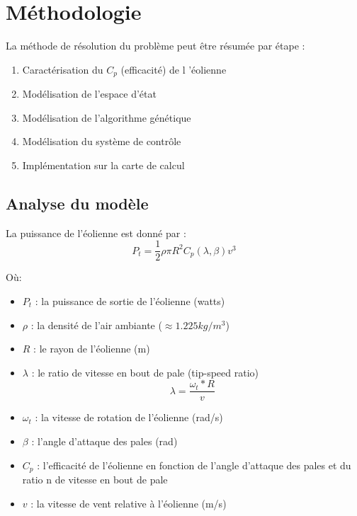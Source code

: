\section{Méthodologie} %
\label{sec:Méthodologie}

La méthode de résolution du problème peut être résumée par étape : 

\begin{enumerate}
\item Caractérisation du $C_p$ (efficacité) de l 'éolienne
\item Modélisation de l'espace d'état
\item Modélisation de l'algorithme génétique
\item Modélisation du système de contrôle
\item Implémentation sur la carte de calcul
\end{enumerate}

\subsection{Analyse du modèle} %
\label{sub:Analyse du modèle}

La puissance de l'éolienne est donné par :
\begin{equation}
\label{eqn:peol}
P_t= \frac{1}{2} \rho \pi R^2 C_p(\lambda,\beta)v^3
\end{equation}

Où:

\begin{itemize}
\item $P_t$ : la puissance de sortie de l'éolienne (watts)
\item $\rho$ : la densité de l'air ambiante ($\approx 1.225kg/m^3$)
\item $R$ : le rayon de l'éolienne (m)
\item $\lambda$ : le ratio de vitesse en bout de pale (tip-speed ratio)
                  \begin{equation}
                  \lambda = \frac{\omega_t * R}{v}
                  \end{equation}
\item $\omega_t$ : la vitesse de rotation de l'éolienne (rad/s)
\item $\beta$ : l'angle d'attaque des pales (rad)
\item $C_p$ : l'efficacité de l'éolienne en fonction de l'angle d'attaque des pales et du ratio n de vitesse en bout de pale
\item $v$ : la vitesse de vent relative à l'éolienne (m/s)
\end{itemize}

